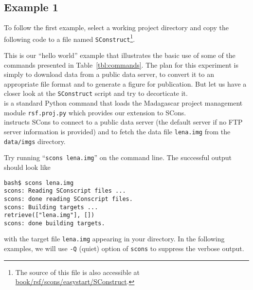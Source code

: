 \subsection{Example 1}

To follow the first example, select a working project directory and
copy the following code
to a file named \texttt{SConstruct}\footnote{The source of this file is also accessible at \href{http://sourceforge.net/p/rsf/code/HEAD/tree/trunk/book/rsf/scons/easystart/SConstruct}{book/rsf/scons/easystart/SConstruct}.}.

%


This is our ``hello  world'' example that illustrates the basic use of
some of the commands presented in Table~\ref{tbl:commands}. The plan
for this experiment is simply to download data from a public data
server, to convert it to an appropriate file format and to generate a
figure for publication. But let us have a closer look at the
\texttt{SConstruct} script and try to decorticate it.\\


%
is a standard Python command that loads the Madagascar project
management module \texttt{rsf.proj.py} which provides our extension to
SCons.\\


%
instructs SCons to connect to a public data server (the default server
if no FTP server information is provided) and to fetch the data file
\texttt{lena.img} from the \texttt{data/imgs} directory. 
\begin{comment}
Note that
Madagascar expects a \texttt{data} folder on top of the specified
directory (i.e.  \texttt{imgs}). In the directory where you have your
SConstruct, running \texttt{scons lena.img} on the command line will
download the file \texttt{lena.img}.  The equivalent command line is
\begin{verbatim}
bash$ wget http://www.ahay.org/data/imgs/lena.img
\end{verbatim}
\end{comment}
%
Try running ``\texttt{scons lena.img}'' on the command line. The successful output should look like
\begin{verbatim}
bash$ scons lena.img
scons: Reading SConscript files ...
scons: done reading SConscript files.
scons: Building targets ...
retrieve(["lena.img"], [])
scons: done building targets.
\end{verbatim}
with the target file \texttt{lena.img} appearing in your directory.
In the following examples, we will use \texttt{-Q} (quiet) option of
\texttt{scons} to suppress the verbose output.

